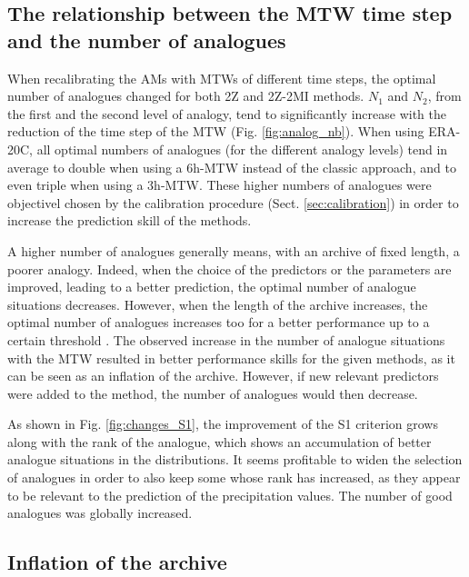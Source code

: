 \documentclass[hess, manuscript]{copernicus}
\begin{document}
	
	\subsection{The relationship between the MTW time step and the number of analogues}
	\label{sec:increase_analognb}
	
	When recalibrating the AMs with MTWs of different time steps, the optimal number of analogues changed for both 2Z and 2Z-2MI methods. $N_{1}$ and $N_{2}$, from the first and the second level of analogy, tend to significantly increase with the reduction of the time step of the MTW (Fig. \ref{fig:analog_nb}). When using ERA-20C, all optimal numbers of analogues (for the different analogy levels) tend in average to double when using a 6h-MTW instead of the classic approach, and to even triple when using a 3h-MTW. These higher numbers of analogues were objectivel chosen by the calibration procedure (Sect. \ref{sec:calibration}) in order to increase the prediction skill of the methods.
	
	A higher number of analogues generally means, with an archive of fixed length, a poorer analogy. Indeed, when the choice of the predictors or the parameters are improved, leading to a better prediction, the optimal number of analogue situations decreases. However, when the length of the archive increases, the optimal number of analogues increases too for a better performance up to a certain threshold \citep[][]{Bontron2004, Hamill2006a}. The observed increase in the number of analogue situations with the MTW resulted in better performance skills for the given methods, as it can be seen as an inflation of the archive. However, if new relevant predictors were added to the method, the number of analogues would then decrease.
	
	As shown in Fig. \ref{fig:changes_S1}, the improvement of the S1 criterion grows along with the rank of the analogue, which shows an accumulation of better analogue situations in the distributions. It seems profitable to widen the selection of analogues in order to also keep some whose rank has increased, as they appear to be relevant to the prediction of the precipitation values. The number of good analogues was globally increased.
	
	
	\subsection{Inflation of the archive}
	\label{sec:archive_reduction}
	
\end{document}
